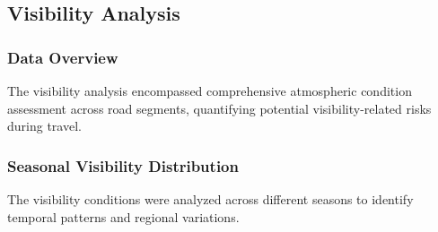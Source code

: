 \documentclass[sigplan,screen]{acmart}
\begin{document}
\subsection{Visibility Analysis}

\subsubsection{Data Overview}
The visibility analysis encompassed comprehensive atmospheric condition assessment across road segments, quantifying potential visibility-related risks during travel.

\subsubsection{Seasonal Visibility Distribution}
The visibility conditions were analyzed across different seasons to identify temporal patterns and regional variations.

%
%
\end{document}

